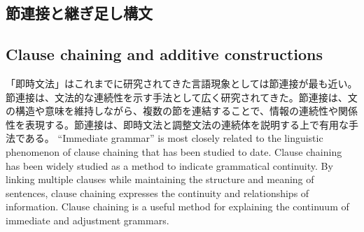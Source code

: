 \documentclass[a4paper,xelatex,ja=standard]{bxjsarticle}
\begin{document}
\ifJPN
  \subsection{節連接と継ぎ足し構文}
\else
  \subsection{Clause chaining and additive constructions}
\fi

\ifJPN
「即時文法」はこれまでに研究されてきた言語現象としては節連接が最も近い。
節連接は、文法的な連続性を示す手法として広く研究されてきた。節連接は、文の構造や意味を維持しながら、複数の節を連結することで、情報の連続性や関係性を表現する。節連接は、即時文法と調整文法の連続体を説明する上で有用な手法である。
\else
``Immediate grammar'' is most closely related to the linguistic phenomenon of clause chaining that has been studied to date. Clause chaining has been widely studied as a method to indicate grammatical continuity. By linking multiple clauses while maintaining the structure and meaning of sentences, clause chaining expresses the continuity and relationships of information. Clause chaining is a useful method for explaining the continuum of immediate and adjustment grammars.
\fi
\end{document}
